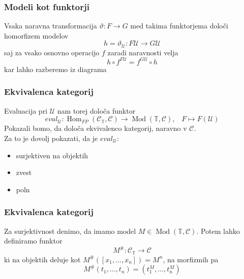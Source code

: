 \documentclass{beamer}
\DeclareMathOperator{\Mod}{Mod}
\DeclareMathOperator{\Hom}{Hom}
\begin{document}
\begin{frame}[fragile]
\frametitle{Modeli kot funktorji}
Vsaka naravna transformacija $\vartheta : F \to G$ med takima funktorjema določi homorfizem modelov $$h = \vartheta_\mathcal{U} : F\mathcal{U} \to G\mathcal{U}$$
\pause
saj za vsako osnovno operacijo $f$ zaradi naravnosti velja
$$h \circ f^{F\mathcal{U}} = f^{G\mathcal{U}} \circ h$$
kar lahko razberemo iz diagrama
\begin{center}
\end{center}
\end{frame}

\begin{frame}
\frametitle{Ekvivalenca kategorij}
Evaluacija pri $\mathcal{U}$ nam torej določa funktor
$$eval_\mathcal{U} : \Hom_{FP}(\mathcal{C}_\mathbb{T}, \mathcal{C}) \to \Mod(\mathbb{T}, \mathcal{C}) \text{,} \quad F \mapsto F(\mathcal{U})$$
\pause
Pokazali bomo, da določa ekvivalenco kategorij, naravno v $\mathcal{C}$.\\
\pause
Za to je dovolj pokazati, da je $eval_\mathcal{U}$:
\begin{itemize}
\item surjektiven na objektih
\item zvest
\item poln
\end{itemize}
\end{frame}

\begin{frame}
\frametitle{Ekvivalenca kategorij}
Za surjektivnost denimo, da imamo model $M \in \Mod(\mathbb{T}, \mathcal{C})$. Potem lahko definiramo funktor 
$$M^{\#} : \mathcal{C}_\mathbb{T} \to \mathcal{C}$$
ki na objektih deluje kot $M^{\#}([x_1, \ldots, x_n]) = M^n$, na morfizmih pa
$$M^{\#}(t_1, \ldots, t_n) = (t_1^M, \ldots, t_n^M)$$
\end{frame}
\end{document}
